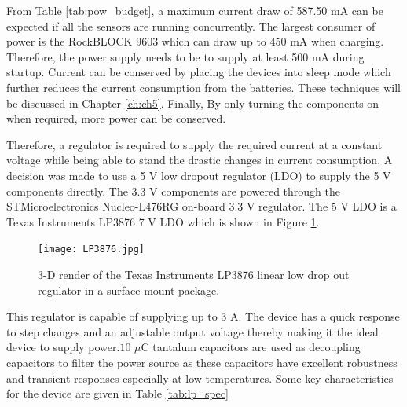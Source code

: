 From Table \ref{tab:pow_budget}, a maximum current draw of 587.50 mA can be expected if all the sensors are running concurrently. The largest consumer of power is the RockBLOCK 9603 which can draw up to 450 mA when charging. Therefore, the power supply needs to be to supply at least 500 mA during startup. Current can be conserved by placing the devices into sleep mode which further reduces the current consumption from the batteries. These techniques will be discussed in Chapter \ref{ch:ch5}. Finally, By only turning the components on when required, more power can be conserved. \par 

Therefore, a regulator is required to supply the required current at a constant voltage while being able to stand the drastic changes in current consumption. A decision was made to use a 5 V low dropout regulator (LDO) to supply the 5 V components directly. The 3.3 V components are powered through the STMicroelectronics Nucleo-L476RG on-board 3.3 V regulator. The 5 V LDO is a Texas Instruments LP3876 7 V LDO \cite{LP3876} which is shown in Figure \ref{fig:lp3876}.


\begin{figure}[H]
	\centering
	\texttt{[image: LP3876.jpg]}
	\caption{3-D render of the Texas Instruments LP3876 linear low drop out regulator in a surface mount package\cite{LP3876}. }
	\label{fig:lp3876}
\end{figure}

This regulator is capable of supplying up to 3 A. The device has a quick response to step changes and an adjustable output voltage thereby making it the ideal device to supply power.$10$ $\mu$C tantalum capacitors are used as decoupling capacitors to filter the power source as these capacitors have excellent robustness and transient responses especially at low temperatures. Some key characteristics for the device are given in Table \ref{tab:lp_spec}

